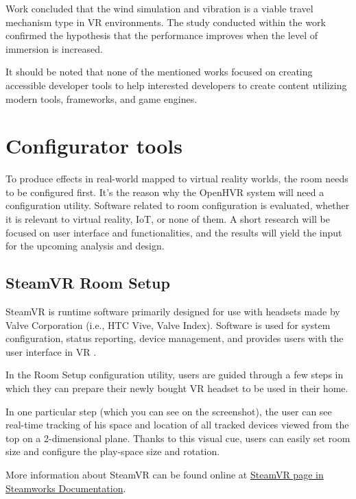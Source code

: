 Work concluded that the wind simulation and vibration is a viable travel
mechanism type in VR environments. The study conducted within
the work confirmed the hypothesis that the performance improves when the level of
immersion is increased.

\vspace{2em}

It should be noted that none of the mentioned works focused on
creating accessible developer tools to help interested developers to create
content utilizing modern tools, frameworks, and game engines.


\hypertarget{x-configurator-tools}{\section{Configurator tools}}
To produce effects in real-world mapped to virtual reality worlds,
the room needs to be configured first.
It’s the reason why the OpenHVR system will need a configuration utility.
Software related to room configuration is evaluated, whether it is relevant
to virtual reality, IoT, or none of them. A short research will be focused on 
user interface and functionalities, and the results will yield 
the input for the upcoming analysis and design.


\hypertarget{x-steamvr-room-setup}{\subsection{SteamVR Room Setup}}
SteamVR is runtime software primarily designed for use with headsets made
by Valve Corporation (i.e., HTC Vive, Valve Index). Software is used for
system configuration, status reporting, device management, and provides users
with the user interface in VR \cite{steamvr}.

In the Room Setup configuration utility, users are guided through a few steps
in which they can prepare their newly bought VR headset to be used in their
home.

In one particular step (which you can see on the screenshot), the user can see
real-time tracking of his space and location of all tracked devices viewed
from the top on a 2-dimensional plane. Thanks to this visual cue, users can
easily set room size and configure the play-space size and rotation.

More information about SteamVR can be found online at
\href{https://partner.steamgames.com/doc/features/steamvr/info}{SteamVR page in Steamworks Documentation}.


